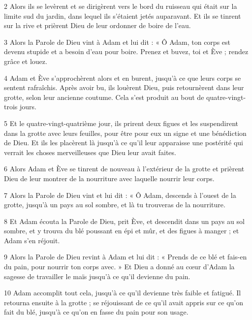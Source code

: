 \par 2 Alors ils se levèrent et se dirigèrent vers le bord du ruisseau qui était sur la limite sud du jardin, dans lequel ils s'étaient jetés auparavant. Et ils se tinrent sur la rive et prièrent Dieu de leur ordonner de boire de l'eau.

\par 3 Alors la Parole de Dieu vint à Adam et lui dit : « Ô Adam, ton corps est devenu stupide et a besoin d'eau pour boire. Prenez et buvez, toi et Ève ; rendez grâce et louez.

\par 4 Adam et Ève s'approchèrent alors et en burent, jusqu'à ce que leurs corps se sentent rafraîchis. Après avoir bu, ils louèrent Dieu, puis retournèrent dans leur grotte, selon leur ancienne coutume. Cela s'est produit au bout de quatre-vingt-trois jours.

\par 5 Et le quatre-vingt-quatrième jour, ils prirent deux figues et les suspendirent dans la grotte avec leurs feuilles, pour être pour eux un signe et une bénédiction de Dieu. Et ils les placèrent là jusqu'à ce qu'il leur apparaisse une postérité qui verrait les choses merveilleuses que Dieu leur avait faites.

\par 6 Alors Adam et Ève se tinrent de nouveau à l'extérieur de la grotte et prièrent Dieu de leur montrer de la nourriture avec laquelle nourrir leur corps.

\par 7 Alors la Parole de Dieu vint et lui dit : « Ô Adam, descends à l'ouest de la grotte, jusqu'à un pays au sol sombre, et là tu trouveras de la nourriture.

\par 8 Et Adam écouta la Parole de Dieu, prit Ève, et descendit dans un pays au sol sombre, et y trouva du blé poussant en épi et mûr, et des figues à manger ; et Adam s'en réjouit.

\par 9 Alors la Parole de Dieu revint à Adam et lui dit : « Prends de ce blé et fais-en du pain, pour nourrir ton corps avec. » Et Dieu a donné au cœur d'Adam la sagesse de travailler le maïs jusqu'à ce qu'il devienne du pain.

\par 10 Adam accomplit tout cela, jusqu'à ce qu'il devienne très faible et fatigué. Il retourna ensuite à la grotte ; se réjouissant de ce qu'il avait appris sur ce qu'on fait du blé, jusqu'à ce qu'on en fasse du pain pour son usage.

